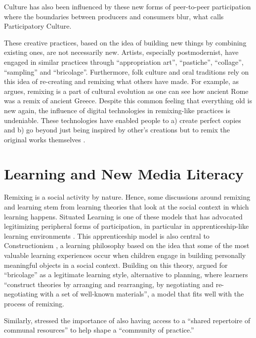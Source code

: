 Culture has also been influenced by these new forms of peer-to-peer participation where the boundaries between producers and consumers blur, what \citet{jenkins_convergence_2006} calls Participatory Culture.

These creative practices, based on the idea of building new things by combining existing ones, are not necessarily new. 
Artists, especially postmodernist, have engaged in similar practices through ``appropriation art'', ``pastiche'', ``collage'', ``sampling'' and ``bricolage''. 
Furthermore, folk culture and oral traditions rely on this idea of re-creating and remixing what others have made. %
For example, as \citet{manovich_remix_2005} argues, remixing is a part of cultural evolution as one can see how ancient Rome was a remix of ancient Greece.
Despite this common feeling that everything old is new again, the influence of digital technologies in remixing-like practices is undeniable. 
These technologies have enabled people to a) create perfect copies and b) go beyond just being inspired by other's creations but to remix the original works themselves \citep{sinnreich_ethics_2009}.

\section{Learning and New Media Literacy}

Remixing is a social activity by nature. Hence, some discussions around remixing and learning stem from learning theories that look at the social context in which learning happens.
Situated Learning is one of these models that has advocated legitimizing peripheral forms of participation, in particular in apprenticeship-like learning environments \citep{lave_situated_1991}. 
This apprenticeship model is also central to Constructionism \citep{papert_mindstorms_1980}, a learning philosophy based on the idea that some of the most valuable learning experiences occur when children engage in building personally meaningful objects in a social context. 
Building on this theory, \citet{turkle_epistemological_1990} argued for ``bricolage'' as a legitimate learning style, alternative to planning, where learners ``construct theories by arranging and rearranging, by negotiating and re-negotiating with a set of well-known materials'', a model that fits well with the process of remixing.

Similarly, \citet{wenger_communities_1998} stressed the importance of also having access to a ``shared repertoire of communal resources'' to help shape a ``community of practice.''

